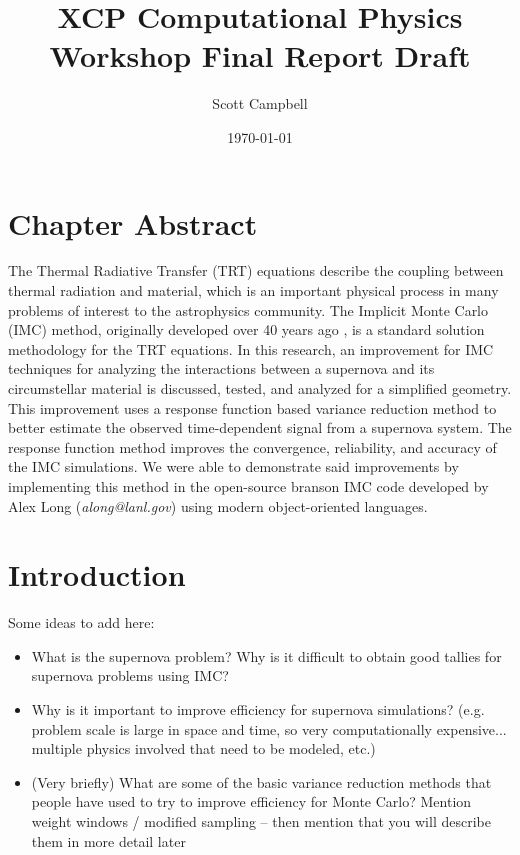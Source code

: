 \documentclass[]{article}
\begin{document}
	\title{XCP Computational Physics Workshop Final Report Draft}
	\author{Scott Campbell}
	\date{\today}

	\maketitle

\section{Chapter Abstract}
  The Thermal Radiative Transfer (TRT) equations describe the coupling between thermal radiation and material, which is an important physical process in many problems of interest to the astrophysics community. The Implicit Monte Carlo (IMC) method, originally developed over 40 years ago \cite{FC}, is a standard solution methodology for the TRT equations.
  In this research, an improvement for IMC techniques for analyzing the interactions between a supernova and its circumstellar material is discussed, tested, and analyzed for a simplified geometry. This improvement uses a response function based variance reduction method to better estimate the observed time-dependent signal from a supernova system. The response function method improves the convergence, reliability, and accuracy of the IMC simulations. We were able to demonstrate said improvements by implementing this method in the open-source branson IMC code developed by Alex Long (\textit{along@lanl.gov}) using modern object-oriented languages.

\section{Introduction}
  Some ideas to add here:
  \begin{itemize}
    \item What is the supernova problem? Why is it difficult to obtain good tallies for supernova problems using IMC?
    \item Why is it important to improve efficiency for supernova simulations? (e.g. problem scale is large in space and time, so very computationally expensive... multiple physics involved that need to be modeled, etc.)
    \item (Very briefly) What are some of the basic variance reduction methods that people have used to try to improve efficiency for Monte Carlo? Mention weight windows / modified sampling -- then mention that you will describe them in more detail later
  \end{itemize}
\end{document}

